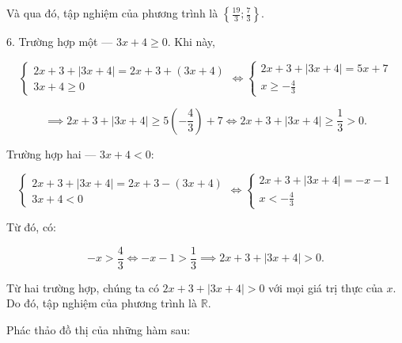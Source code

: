 Và qua đó, tập nghiệm của phương trình là $\left\{\frac{19}{3}; \frac{7}{3}\right\}$.

6. \textcolor{colorEmphasisCyan}{Trường hợp một --- $3x + 4 \geq 0$}. Khi này, 

\begin{equation*}
   \begin{cases}
      2x + 3 + |3x + 4| = 2x + 3 + (3x + 4) \\
      3x + 4 \geq 0
   \end{cases} \iff \begin{cases}
      2x + 3 + |3x + 4| = 5x + 7 \\
      x \geq -\frac{4}{3}
   \end{cases}
\end{equation*}

\begin{equation*}
   \implies 2x + 3 + |3x + 4| \geq 5 \left(-\frac{4}{3}\right) + 7 \iff 2x + 3 + |3x + 4| \geq \frac{1}{3} > 0.
\end{equation*}

\textcolor{colorEmphasis}{Trường hợp hai --- $3x + 4 < 0$}:

\begin{equation*}
   \begin{cases}
      2x + 3 + |3x + 4| = 2x + 3 - (3x + 4) \\
      3x + 4 < 0
   \end{cases} \iff \begin{cases}
      2x + 3 + |3x + 4| = -x - 1 \\
      x < -\frac{4}{3}
   \end{cases}
\end{equation*}

Từ đó, có:

\begin{equation*}
   -x > \frac{4}{3} \iff -x - 1 > \frac{1}{3} \implies 2x + 3 + |3x + 4| > 0.
\end{equation*}

Từ hai trường hợp, chúng ta có $2x + 3 + |3x + 4| > 0$ với mọi giá trị thực của $x$. Do đó, tập nghiệm của phương trình là $\mathbb{R}$.


\exercise Phác thảo đồ thị của những hàm sau:

